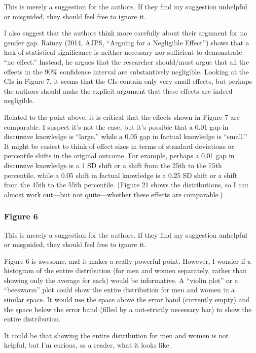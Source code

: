 This is merely a suggestion for the authors. If they find my suggestion unhelpful or misguided, they should feel free to ignore it.

I also suggest that the authors think more carefully about their argument for no gender gap. Rainey (2014, AJPS, “Arguing for a Negligible Effect”) shows that a lack of statistical significance is neither necessary nor sufficient to demonstrate “no effect.” Instead, he argues that the researcher should/must argue that all the effects in the 90\% confidence interval are substantively negligible. Looking at the CIs in Figure 7, it seems that the CIs contain only very small effects, but perhaps the authors should make the explicit argument that these effects are indeed negligible.

Related to the point above, it is critical that the effects shown in Figure 7 are comparable. I suspect it’s not the case, but it’s possible that a 0.01 gap in discursive knowledge is “large,” while a 0.05 gap in factual knowledge is “small.” It might be easiest to think of effect sizes in terms of standard deviations or percentile shifts in the original outcome. For example, perhaps a 0.01 gap in discursive knowledge is a 1 SD shift or a shift from the 25th to the 75th percentile, while a 0.05 shift in factual knowledge is a 0.25 SD shift or a shift from the 45th to the 55th percentile. (Figure 21 shows the distributions, so I can almost work out—but not quite—whether these effects are comparable.)

\subsubsection*{Figure 6}

This is merely a suggestion for the authors. If they find my suggestion unhelpful or misguided, they should feel free to ignore it.

Figure 6 is awesome, and it makes a really powerful point. However, I wonder if a histogram of the entire distribution (for men and women separately, rather than showing only the average for each) would be informative. A “violin plot” or a “beeswarm” plot could show the entire distribution for men and women in a similar space. It would use the space above the error band (currently empty) and the space below the error band (filled by a not-strictly necessary bar) to show the entire distribution.

It could be that showing the entire distribution for men and women is not helpful, but I’m curious, as a reader, what it looks like.